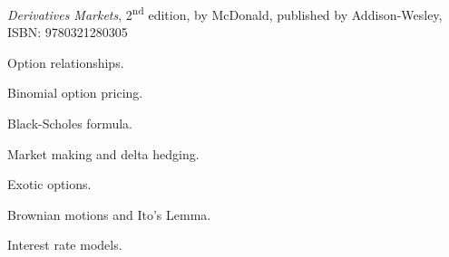 \documentclass{osucourse}
\begin{document}
\CatalogDescription
\PrerequisitesAndExclusions

\begin{Text}
\emph{Derivatives Markets}, 2\textsuperscript{nd}        edition,   by   McDonald,      published   by    Addison-Wesley, ISBN: 9780321280305
\end{Text}

\begin{TopicsList}
\item Option relationships.
\item Binomial option pricing.
\item Black-Scholes formula.
\item Market making and delta hedging.
\item Exotic options.
\item Brownian motions and Ito's Lemma.
\item Interest rate models.
\end{TopicsList}
\end{document}
